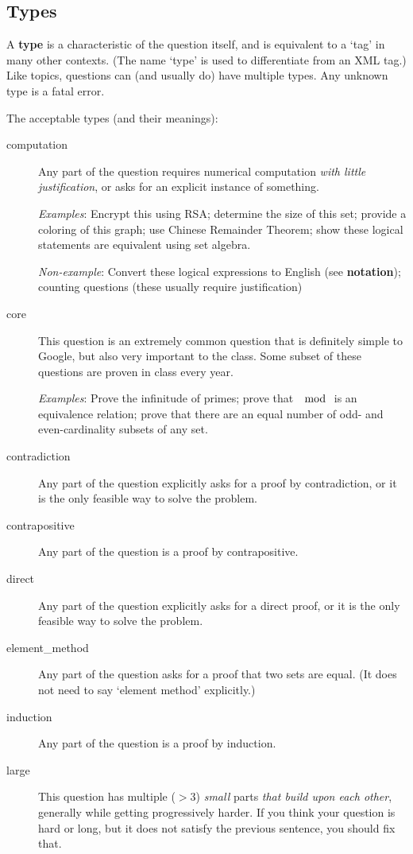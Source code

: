   \subsection{Types}
    A \textbf{type} is a characteristic of the question itself, and is 
    equivalent to a `tag' in many other contexts. (The name `type' is used 
    to differentiate from an XML tag.) Like topics, questions can (and 
    usually do) have multiple types. Any unknown type is a fatal error.
    
    The acceptable types (and their meanings):
    \begin{description}
      \item[computation] Any part of the question requires numerical 
      computation \textit{with little justification}, or asks for an 
      explicit instance of something.
      
        \textit{Examples}: Encrypt this using RSA; determine the size of 
        this set; provide a coloring of this graph; use Chinese Remainder 
        Theorem; show these logical statements are equivalent using set 
        algebra.
      
        \textit{Non-example}: Convert these logical expressions to English 
        (see \textbf{notation}); counting questions (these usually require 
        justification)
      \item[core] This question is an extremely common question that is 
      definitely simple to Google, but also very important to the class. 
      Some subset of these questions are proven in class every year.
      
        \textit{Examples}: Prove the infinitude of primes; prove that 
        $\mod$ is an equivalence relation; prove that there are an equal 
        number of odd- and even-cardinality subsets of any set.
      \item[contradiction] Any part of the question explicitly asks for a 
      proof by contradiction, or it is the only feasible way to solve the 
      problem.
      \item[contrapositive] Any part of the question is a proof by 
      contrapositive.
      \item[direct] Any part of the question explicitly asks for a direct 
      proof, or it is the only feasible way to solve the problem.
      \item[element\_method] Any part of the question asks for a proof 
      that two sets are equal. (It does not need to say `element method' 
      explicitly.)
      \item[induction] Any part of the question is a proof by induction.
      \item[large] This question has multiple ($>3$) \textit{small} parts 
      \textit{that build upon each other}, generally while getting 
      progressively harder. If you think your question is hard or long, 
      but it does not satisfy the previous sentence, you should fix that.
      

\end{description}
